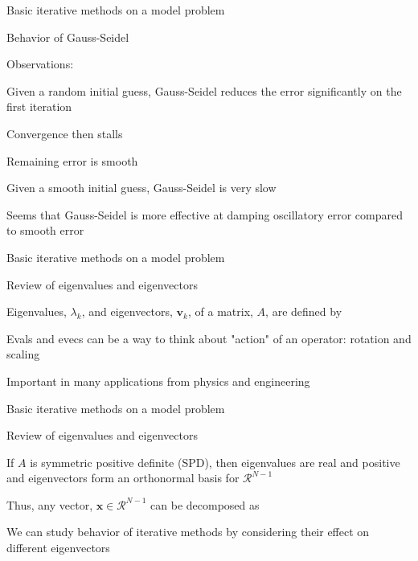 \documentclass[18pt,xcolor=table]{beamer}
\begin{document}
\begin{frame}{Basic iterative methods on a model problem}
\begin{block}{Behavior of Gauss-Seidel}
\bit
\item Observations:
\bit
\item Given a random initial guess, Gauss-Seidel reduces the error significantly on the first iteration
\item Convergence then stalls
\item Remaining error is smooth
\item Given a smooth initial guess, Gauss-Seidel is very slow
\eit
\item Seems that Gauss-Seidel is more effective at damping oscillatory error compared to smooth error
\eit
\end{block}
\end{frame}

\begin{frame}{Basic iterative methods on a model problem}
\begin{block}{Review of eigenvalues and eigenvectors}
\bit
\item Eigenvalues, $\lambda_k$, and eigenvectors, $\mathbf{v}_k$, of a matrix, $A$, are defined by
\item Evals and evecs can be a way to think about "action" of an operator: rotation and scaling
\item Important in many applications from physics and engineering
\eit
\end{block}
\end{frame}

\begin{frame}{Basic iterative methods on a model problem}
\begin{block}{Review of eigenvalues and eigenvectors}
\bit
\item If $A$ is symmetric positive definite (SPD), then eigenvalues are real and positive and eigenvectors form an orthonormal basis for $\mathcal{R}^{N-1}$
\item Thus, any vector, $\mathbf{x}\in\mathcal{R}^{N-1}$ can be decomposed as 
\item We can study behavior of iterative methods by considering their effect on different eigenvectors
\eit
\end{block}
\end{frame}
\end{document}
